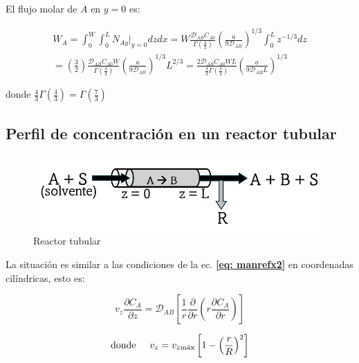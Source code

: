 El flujo molar de $A$ en $y=0$ es:

\begin{equation}
	\begin{split}
	W_A = \int_0^W \int_0^L N_{Ay}|_{y=0} dz dx
	=W \frac{\mathscr{D}_{AB} C_{A0}}{\Gamma(\frac{4}{3})} \left( \frac{a}{9 \mathscr{D}_{AB}} \right)^{1/3} \int_0^L z^{-1/3} dz \\
	=\left( \frac{3}{2} \right) \frac{\mathscr{D}_{AB} C_{A0} W}{\Gamma (\frac{4}{3})} \left( \frac{a}{9 \mathscr{D}_{AB}} \right)^{1/3} L^{2/3}
	=\frac{2 \mathscr{D}_{AB} C_{A0} WL}{\frac{4}{3} \Gamma (\frac{4}{3})} \left( \frac{a}{9 \mathscr{D}_{AB} L} \right)^{1/3}
	\end{split}
\end{equation}

donde $\frac{4}{3} \Gamma (\frac{4}{3}) = \Gamma (\frac{7}{3})$

\subsection{Perfil de concentración en un reactor tubular}

\begin{figure}[H]
	\centering
	\includegraphics[scale=0.4]{./Capitulo2/Imagenes/fig-2-8.PNG}
	\caption{Reactor tubular}
\end{figure}

La situación es similar a las condiciones de la ec. \textbf{\eqref{eq: manrefx2}} en coordenadas cilíndricas, esto es: 

\begin{equation} \label{eq: manrefx17}
v_z \frac{\partial C_A}{\partial z} = \mathscr{D}_{AB} \left[ \frac{1}{r} \frac{\partial}{\partial r} \left( r \frac{\partial C_A}{\partial r} \right)  \right]
\end{equation}

\begin{equation} \label{eq: manrefx18}
\text{donde} \hspace{0.5cm} v_z = v_{z\text{máx}} \left[ 1 - \left( \frac{r}{R} \right)^2 \right]
\end{equation}

